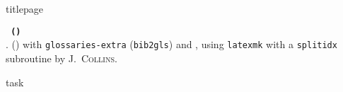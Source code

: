 %
{titlepage}%
\cleardoubleevenpage%
\vspace*{\fill}
\DeclareUrlCommand{}%
{%
\thispagestyle{empty}
\begin{minipage}{0.5\linewidth}
\color{g2}
\footnotesize
\raggedright
\noindent\texttt{\bfseries\jobname{}
\expandafter\EscWrapper\expandafter{\GitVersion}
(\expandafter\EscWrapper\expandafter{\GitShorthash})}\\[\baselineskip]

\noindent\prettybanner{}.
\hologo{\fmtname} (\fmtversion) with \texttt{glossaries-extra} (\texttt{bib2gls}) and , using \texttt{latexmk} with a \texttt{splitidx} subroutine by J.\ \textsc{Collins}.
\end{minipage}
}%
\cleardoubleoddpage%
{task}%
\cleardoubleoddpage
\vspace*{\fill}
%
%
